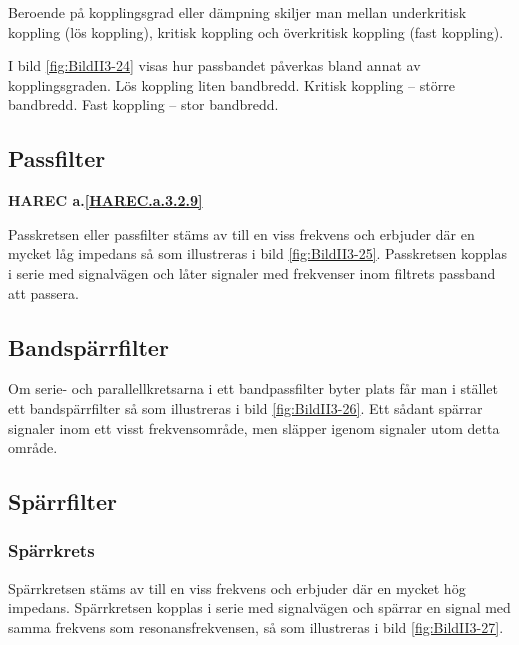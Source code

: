 Beroende på kopplingsgrad eller dämpning skiljer man mellan underkritisk
koppling (lös koppling), kritisk koppling och överkritisk koppling
(fast koppling).

I bild \ref{fig:BildII3-24} visas hur passbandet påverkas bland annat av kopplingsgraden.
Lös koppling liten bandbredd.
Kritisk koppling -- större bandbredd.
Fast koppling -- stor bandbredd.

\subsection{Passfilter}
\textbf{HAREC a.\ref{HAREC.a.3.2.9}\label{myHAREC.a.3.2.9d}}


Passkretsen eller passfilter stäms av till en viss frekvens och erbjuder där
en mycket låg impedans så som illustreras i bild \ref{fig:BildII3-25}.
Passkretsen kopplas i serie med signalvägen och låter signaler med
frekvenser inom filtrets passband att passera.

\subsection{Bandspärrfilter}


Om serie- och parallellkretsarna i ett bandpassfilter byter plats får man
i stället ett bandspärrfilter så som illustreras i bild \ref{fig:BildII3-26}.
Ett sådant spärrar signaler inom ett visst frekvensområde, men släpper igenom
signaler utom detta område.

\subsection{Spärrfilter}


\subsubsection{Spärrkrets}
Spärrkretsen stäms av till en viss frekvens och erbjuder där en mycket hög
impedans.
Spärrkretsen kopplas i serie med signalvägen och spärrar en signal med samma
frekvens som resonansfrekvensen, så som illustreras i bild \ref{fig:BildII3-27}.

